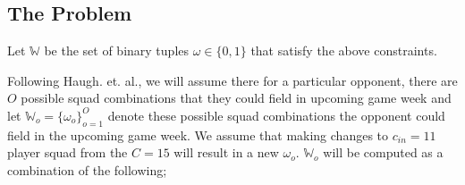 \documentclass[12pt,oneside,a4paper]{book}
\theoremstyle{definition}
\theoremstyle{remark}
\begin{document}
				\subsection{The Problem}

					Let $\mathbb{W}$ be the set of binary tuples $\omega \in  \{0,1\}$ that satisfy the above constraints.

					Following Haugh. et. al., we will assume there for a particular opponent, there are $O$  possible squad combinations that they could field in upcoming game week and let $\mathbb{W}_o = \{\omega_o\}^O_{o=1}$ denote these possible squad combinations the opponent could field in the upcoming game week.
					We assume that making changes to $c_{in}=11$ player squad from the $C=15$ will result in a new $\omega_o$. $\mathbb{W}_{o}$ will be computed as a combination of the following;
\end{document}

